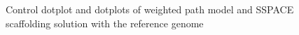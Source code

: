 \documentclass[12pt]{article}
\begin{document}
\begin{figure}[h!]
\begin{center}
{
}
\end{center}
\caption{Control dotplot and dotplots of weighted path model and SSPACE scaffolding solution with the reference genome}
\label{dotplotsols}
\end{figure}
\end{document}

